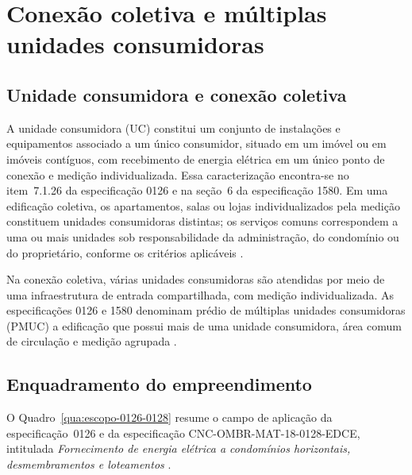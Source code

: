 \section{Conexão coletiva e múltiplas unidades consumidoras}
\label{sec:conexaocoletiva}

\subsection{Unidade consumidora e conexão coletiva}

A unidade consumidora (UC) constitui um conjunto de instalações e equipamentos associado a um único consumidor, situado em um imóvel ou em imóveis contíguos, com recebimento de energia elétrica em um único ponto de conexão e medição individualizada. Essa caracterização encontra-se no item~7.1.26 da especificação 0126 e na seção~6 da especificação 1580. Em uma edificação coletiva, os apartamentos, salas ou lojas individualizados pela medição constituem unidades consumidoras distintas; os serviços comuns correspondem a uma ou mais unidades sob responsabilidade da administração, do condomínio ou do proprietário, conforme os critérios aplicáveis \cite[item~7.1.26]{enel0126}\cite[seção~6]{enel1580}.

Na conexão coletiva, várias unidades consumidoras são atendidas por meio de uma infraestrutura de entrada compartilhada, com medição individualizada. As especificações 0126 e 1580 denominam prédio de múltiplas unidades consumidoras (PMUC) a edificação que possui mais de uma unidade consumidora, área comum de circulação e medição agrupada \cite[item~7.1.20]{enel0126}\cite[seção~6]{enel1580}.

\subsection{Enquadramento do empreendimento}

O Quadro~\ref{qua:escopo-0126-0128} resume o campo de aplicação da especificação~0126 e da especificação CNC-OMBR-MAT-18-0128-EDCE, intitulada \emph{Fornecimento de energia elétrica a condomínios horizontais, desmembramentos e loteamentos} \cite{enel0128}.

